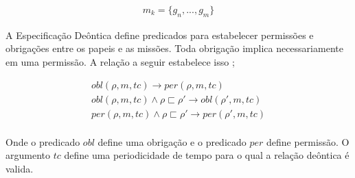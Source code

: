 \begin{eqnarray}\nonumber
	m_k = \{ g_n,...,g_m\}
\end{eqnarray}


A Especificação Deôntica define predicados para estabelecer permissões e obrigações entre os papeis e as missões. Toda obrigação implica necessariamente em uma permissão. A relação a seguir estabelece isso \cite{moiseframework} \cite{deonticOne}; 

\begin{eqnarray}\nonumber
	obl(\rho,m,tc) \to per(\rho,m,tc) \\
	obl(\rho,m,tc) \wedge \rho \sqsubset \rho' \to obl(\rho',m,tc) \\
	per(\rho,m,tc) \wedge \rho \sqsubset \rho' \to per(\rho',m,tc) \\	
\end{eqnarray}

Onde o predicado $obl$ define uma obrigação e o predicado $per$ define permissão. O argumento $tc$ define uma periodicidade de tempo para o qual a relação deôntica é valida. 
